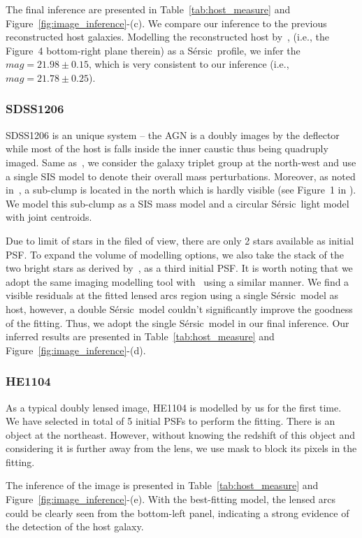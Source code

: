 \documentclass[fleqn,usenatbib]{mnras}
\newcommand{\sersic}{S\'ersic}
\begin{document}
The final inference are presented in Table~\ref{tab:host_measure} and Figure~\ref{fig:image_inference}-(c). We compare our inference to the previous reconstructed host galaxies. Modelling the reconstructed host by~\citet{Rusu2019}, (i.e., the Figure~4 bottom-right plane therein) as a \sersic\ profile, we infer the $mag = 21.98 \pm 0.15$, which is very consistent to our inference (i.e., $mag = 21.78 \pm 0.25$).

\subsubsection{SDSS1206}
SDSS1206 is an unique system -- the AGN is a doubly images by the deflector while most of the host is falls inside the inner caustic thus being quadruply imaged. Same as~\citet{Birrer2019}, we consider the galaxy triplet group at the north-west and use a single SIS model to denote their overall mass perturbations. Moreover, as noted in~\citet{Birrer2019}, a sub-clump is located in the north which is hardly visible (see Figure~1 in \citet{Birrer2019}). We model this sub-clump as a SIS mass model and a circular \sersic\ light model with joint centroids.

Due to limit of stars in the filed of view, there are only 2 stars available as initial PSF. To expand the volume of modelling options, we also take the stack of the two bright stars as derived by~\citet{Birrer2019}, as a third initial PSF. It is worth noting that we adopt the same imaging modelling tool with~\citet{Birrer2019} using a similar manner. We find a visible residuals at the fitted lensed arcs region using a single \sersic\ model as host, however, a double \sersic\ model couldn't significantly improve the goodness of the fitting. Thus, we adopt the single \sersic\ model in our final inference. Our inferred results are presented in Table~\ref{tab:host_measure} and Figure~\ref{fig:image_inference}-(d).


\subsubsection{HE1104}
As a typical doubly lensed image, HE1104 is modelled by us for the first time. We have selected in total of 5 initial PSFs to perform the fitting. There is an object at the northeast. However, without knowing the redshift of this object and considering it is further away from the lens, we use mask to block its pixels in the fitting.

The inference of the image is presented in Table~\ref{tab:host_measure} and Figure~\ref{fig:image_inference}-(e). With the best-fitting model, the lensed arcs could be clearly seen from the bottom-left panel, indicating a strong evidence of the detection of the host galaxy.
\end{document}
